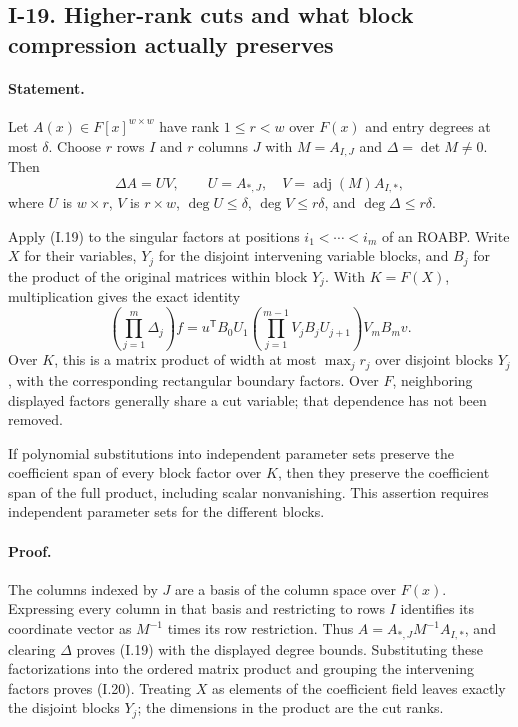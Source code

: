 \subsection{I-19. Higher-rank cuts and what block compression actually preserves}
\label{I-19}

\paragraph{Statement.}
Let $A(x)\in F[x]^{w\times w}$ have rank $1\le r<w$ over $F(x)$
and entry degrees at most $\delta$.  Choose $r$ rows $I$ and
$r$ columns $J$ with $M=A_{I,J}$ and $\Delta=\det M\ne0$.
Then
\[
 \Delta A=UV,\qquad
 U=A_{*,J},\quad V=\operatorname{adj}(M)A_{I,*},
\tag{I.19}\label{eq:I-rank-cut}
\]
where $U$ is $w\times r$, $V$ is $r\times w$,
$\deg U\le\delta$, $\deg V\le r\delta$, and
$\deg\Delta\le r\delta$.

Apply (I.19) to the singular factors at positions
$i_1<\cdots<i_m$ of an ROABP.  Write $X$ for their variables,
$Y_j$ for the disjoint intervening variable blocks, and $B_j$
for the product of the original matrices within block $Y_j$.
With $K=F(X)$, multiplication gives the exact identity
\[
 \left(\prod_{j=1}^m\Delta_j\right)f
 =u^{\mathsf T}B_0U_1
    \left(\prod_{j=1}^{m-1}V_jB_jU_{j+1}\right)V_mB_mv.
\tag{I.20}\label{eq:I-outer-cut}
\]
Over $K$, this is a matrix product of width at most
$\max_j r_j$ over disjoint blocks $Y_j$, with the corresponding
rectangular boundary factors.  Over $F$, neighboring displayed
factors generally share a cut variable; that dependence has not
been removed.

If polynomial substitutions into independent parameter sets preserve
the coefficient span of every block factor over $K$, then they
preserve the coefficient span of the full product, including scalar
nonvanishing.  This assertion requires independent parameter sets
for the different blocks.

\paragraph{Proof.}
The columns indexed by $J$ are a basis of the column space over
$F(x)$.  Expressing every column in that basis and restricting to
rows $I$ identifies its coordinate vector as $M^{-1}$ times its
row restriction.  Thus $A=A_{*,J}M^{-1}A_{I,*}$, and clearing
$\Delta$ proves (I.19) with the displayed degree bounds.
Substituting these factorizations into the ordered matrix product
and grouping the intervening factors proves (I.20).  Treating $X$
as elements of the coefficient field leaves exactly the disjoint
blocks $Y_j$; the dimensions in the product are the cut ranks.

